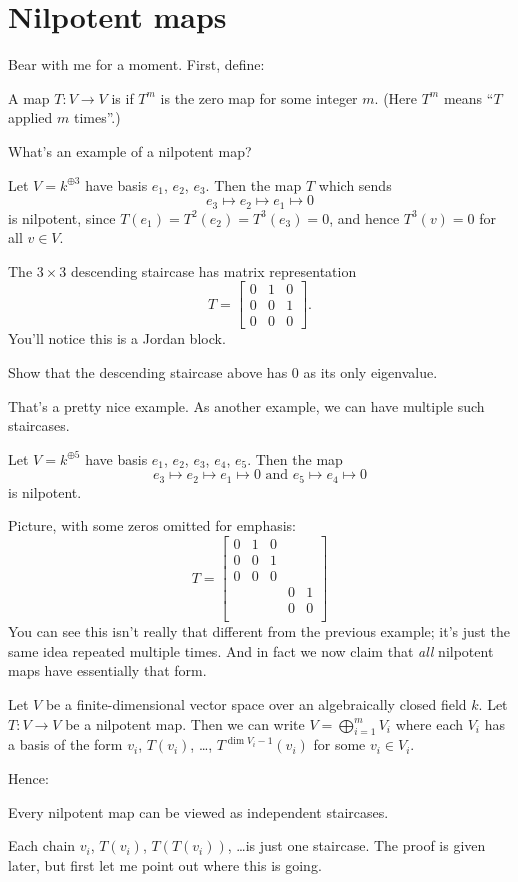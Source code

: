 \section{Nilpotent maps}
Bear with me for a moment.  First, define:
\begin{definition}
	A map $T \colon V \to V$ is  if $T^m$ is the zero map for some integer $m$.
	(Here $T^m$ means ``$T$ applied $m$ times''.)
\end{definition}
What's an example of a nilpotent map?
\begin{example}
        Let $V = k^{\oplus 3}$ have basis $e_1$, $e_2$, $e_3$.
	Then the map $T$ which sends
	\[ e_3 \mapsto e_2 \mapsto e_1 \mapsto 0 \]
	is nilpotent, since $T(e_1) = T^2(e_2) = T^3(e_3) = 0$,
	and hence $T^3(v) = 0$ for all $v \in V$.
\end{example}
The $3 \times 3$ descending staircase has matrix representation
\[ T = \begin{bmatrix}
		0 & 1 & 0 \\
		0 & 0 & 1 \\
		0 & 0 & 0
	\end{bmatrix}. \]
You'll notice this is a Jordan block.
\begin{exercise}
	Show that the descending staircase above
	has $0$ as its only eigenvalue.
\end{exercise}

That's a pretty nice example.
As another example, we can have multiple such staircases.
\begin{example}
	Let $V = k^{\oplus 5}$ have basis $e_1$, $e_2$, $e_3$, $e_4$, $e_5$.
	Then the map
	\[ e_3 \mapsto e_2 \mapsto e_1 \mapsto 0 \text{ and }
		e_5 \mapsto e_4 \mapsto 0 \]
	is nilpotent.
\end{example}
Picture, with some zeros omitted for emphasis:
\[ T = \begin{bmatrix}
		0 & 1 & 0 &   &   \\
		0 & 0 & 1 &   &   \\
		0 & 0 & 0 &   &   \\
		  &   &   & 0 & 1 \\
		  &   &   & 0 & 0 \\
	\end{bmatrix}
\]
You can see this isn't really that different
from the previous example;
it's just the same idea repeated multiple times.
And in fact we now claim that \emph{all}
nilpotent maps have essentially that form.
\begin{theorem}
	Let $V$ be a finite-dimensional vector space
	over an algebraically closed field $k$.
	Let $T \colon V \to V$ be a nilpotent map.
	Then we can write $V = \bigoplus_{i=1}^m V_i$
	where each $V_i$ has a basis of the form
	$v_i$, $T(v_i)$, \dots, $T^{\dim V_i - 1}(v_i)$
	for some $v_i \in V_i$.
\end{theorem}
Hence:
\begin{moral}
	Every nilpotent map can be viewed as independent staircases.
\end{moral}
Each chain $v_i$, $T(v_i)$, $T(T(v_i))$, \dots is just one staircase.
The proof is given later, but first let me point out where this is going.

